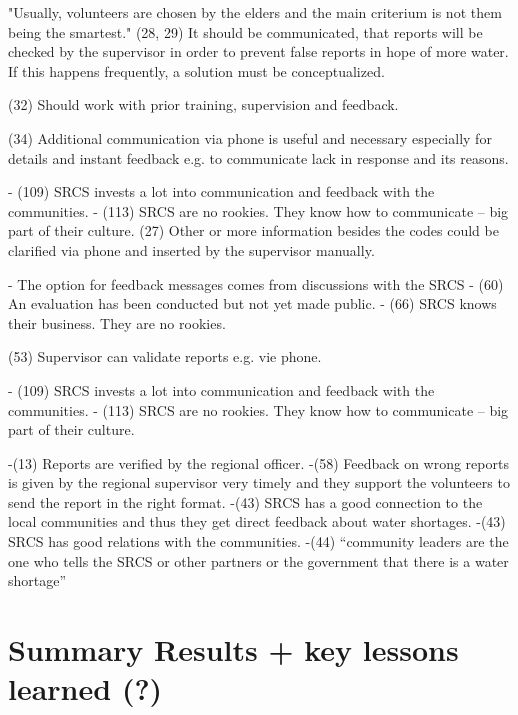 
"Usually, volunteers are chosen by the elders and the main criterium is not them being the smartest."
(28, 29) It should be communicated, that reports will be checked by the supervisor in order to prevent false reports in hope of more water. If this happens frequently, a solution must be conceptualized.

(32) Should work with prior training, supervision and feedback.

(34) Additional communication via phone is useful and necessary especially for details and instant feedback e.g. to communicate lack in response and its reasons.

-	(109) SRCS invests a lot into communication and feedback with the communities.
-	(113) SRCS are no rookies. They know how to communicate – big part of their culture.
(27) Other or more information besides the codes could be clarified via phone and inserted by the supervisor manually.

-	The option for feedback messages comes from discussions with the SRCS
-	(60) An evaluation has been conducted but not yet made public.
-	(66) SRCS knows their business. They are no rookies.

(53) Supervisor can validate reports e.g. vie phone.

-	(109) SRCS invests a lot into communication and feedback with the communities.
-	(113) SRCS are no rookies. They know how to communicate – big part of their culture.



-(13) Reports are verified by the regional officer.
-(58) Feedback on wrong reports is given by the regional supervisor very timely and they support the volunteers to send the report in the right format.
-(43) SRCS has a good connection to the local communities and thus they get direct feedback about water shortages.
-(43) SRCS has good relations with the communities.
-(44) “community leaders are the one who tells the SRCS or other partners or the government that there is a water shortage”



\section{Summary Results + key lessons learned (?)}





